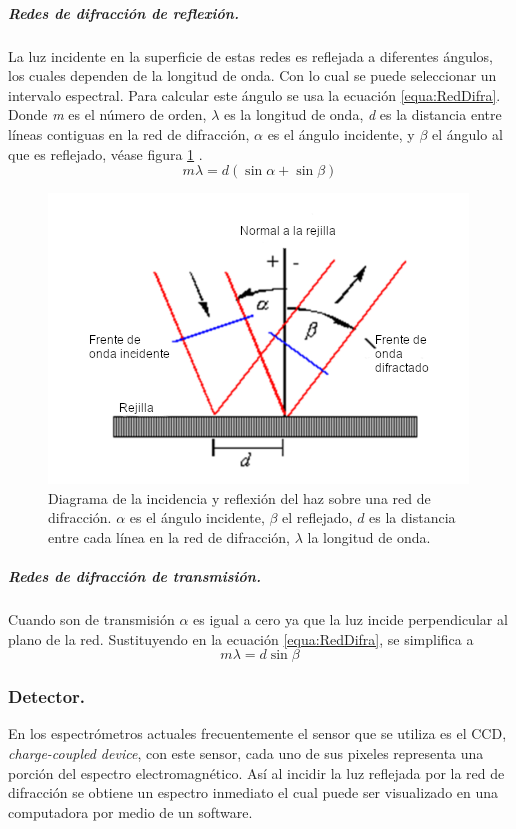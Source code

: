 \subparagraph{Redes de difracción de reflexión.}
La luz incidente en la superficie de estas redes es reflejada a diferentes ángulos, los cuales dependen de la longitud de onda. Con lo cual se puede seleccionar un intervalo espectral. Para calcular este ángulo se usa la ecuación \ref{equa:RedDifra}. Donde \textit{m} es el número de orden, $\lambda$ es la longitud de onda, \textit{d} es la distancia entre líneas contiguas en la red de difracción, $\alpha$ es el ángulo incidente, y $\beta$ el ángulo al que es reflejado, véase figura \ref{fig:reflexion} \cite{Excel2000}.
\begin{equation}
	m\lambda = d(\sin\alpha + \sin\beta)
	\label{equa:RedDifra}
\end{equation}
\begin{figure}[h!]
	\centering
	\includegraphics[width=0.6\linewidth]{Imagenes/reflexion}
	\caption{Diagrama de la incidencia y reflexión del haz sobre una red de difracción. $\alpha$ es el ángulo incidente, $\beta$ el reflejado, $d$  es la distancia entre cada línea en la red de difracción, $\lambda$ la longitud de onda. \cite{Excel2000}}
	\label{fig:reflexion}
\end{figure}


\subparagraph{Redes de difracción de transmisión.}
Cuando son de transmisión $\alpha$ es igual a cero ya que la luz incide perpendicular al plano de la red. Sustituyendo en la ecuación \ref{equa:RedDifra}, se simplifica a
\begin{equation}
m\lambda = d\sin\beta
\label{equa:difra}
\end{equation}
\subsubsection{Detector.}
En los espectrómetros actuales frecuentemente el sensor que se utiliza es el CCD, \textit{charge-coupled device}, con este sensor, cada uno de sus pixeles representa una porción del espectro electromagnético. Así al incidir la luz reflejada por la red de difracción se obtiene un espectro inmediato el cual puede ser visualizado en una computadora por medio de un software.

